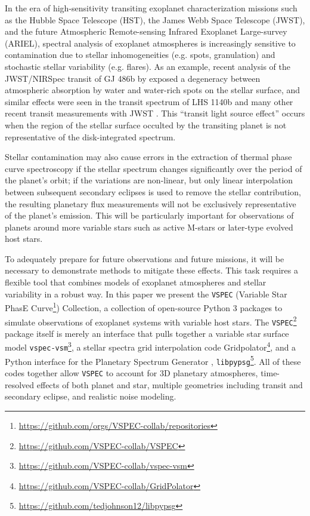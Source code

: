 \documentclass[linenumbers,preprint,authoryear]{elsarticle}
\newcommand{\vspec}[1]{\texttt{VSPEC}#1}
\begin{document}
In the era of high-sensitivity transiting exoplanet characterization missions such as the Hubble Space Telescope (HST), the James Webb Space Telescope (JWST), and the future Atmospheric Remote-sensing Infrared Exoplanet Large-survey (ARIEL), spectral analysis of exoplanet atmospheres is increasingly sensitive to contamination due to stellar inhomogeneities (e.g. spots, granulation) and stochastic stellar variability (e.g. flares).  As an example, recent analysis of the JWST/NIRSpec transit of GJ 486b by \citet{moran2023} exposed a degeneracy between atmospheric absorption by water and water-rich spots on the stellar surface, and similar effects were seen in the transit spectrum of LHS 1140b \citep{cadieux2024} and many other recent transit measurements with JWST \citep[e.g.,][]{lim2023,may2023,fournier-tondreau2024}. This ``transit light source effect'' \citep[TLS,][see also \citet{apai2018,barclay2021,garcia2022,barclay2023}]{rackham2018} occurs when the region of the stellar surface occulted by the transiting planet is not representative of the disk-integrated spectrum.

Stellar contamination may also cause errors in the extraction of thermal phase curve spectroscopy if the stellar spectrum changes significantly over the period of the planet's orbit; if the variations are non-linear, but only linear interpolation between subsequent secondary eclipses is used to remove the stellar contribution, the resulting planetary flux measurements will not be exclusively representative of the planet's emission. This will be particularly important for observations of planets around more variable stars such as active M-stars or later-type evolved host stars. %

To adequately prepare for future observations and future missions, it will be necessary to demonstrate methods to mitigate these effects. This task requires a flexible tool that combines models of exoplanet atmospheres and stellar variability in a robust way. In this paper we present the \vspec{} (Variable Star PhasE Curve\footnote{\url{https://github.com/orgs/VSPEC-collab/repositories}}) Collection, a collection of open-source Python 3 packages to simulate observations of exoplanet systems with variable host stars. The \vspec{}\footnote{\url{https://github.com/VSPEC-collab/VSPEC}} package itself is merely an interface that pulls together a variable star surface model \texttt{vspec-vsm}\footnote{\url{https://github.com/VSPEC-collab/vspec-vsm}}, a stellar spectra grid interpolation code Gridpolator\footnote{\url{https://github.com/VSPEC-collab/GridPolator}}, and a Python interface for the Planetary Spectrum Generator \citep[PSG,][]{villanueva2018}, \texttt{libpypsg}\footnote{\url{https://github.com/tedjohnson12/libpypsg}}. All of these codes together allow \vspec{} to account for 3D planetary atmospheres, time-resolved effects of both planet and star, multiple geometries including transit and secondary eclipse, and realistic noise modeling.
\end{document}
